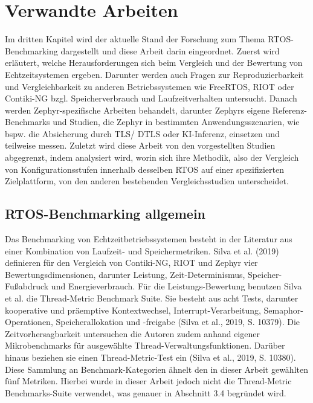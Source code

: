 \chapter{Verwandte Arbeiten}

Im dritten Kapitel wird der aktuelle Stand der Forschung zum Thema RTOS-Benchmarking dargestellt und diese Arbeit darin eingeordnet. Zuerst wird erläutert, welche Herausforderungen sich beim Vergleich und der Bewertung von Echtzeitsystemen ergeben. Darunter werden auch Fragen zur Reproduzierbarkeit und Vergleichbarkeit zu anderen Betriebssystemen wie FreeRTOS, RIOT oder Contiki-NG bzgl. Speicherverbrauch und Laufzeitverhalten untersucht. Danach werden Zephyr-spezifische Arbeiten behandelt, darunter Zephyrs eigene Referenz-Benchmarks und Studien, die Zephyr in bestimmten Anwendungsszenarien, wie bspw. die Absicherung durch TLS/ DTLS oder KI-Inferenz, einsetzen und teilweise messen. Zuletzt wird diese Arbeit von den vorgestellten Studien abgegrenzt, indem analysiert wird, worin sich ihre Methodik, also der Vergleich von Konfigurationsstufen innerhalb desselben RTOS auf einer spezifizierten Zielplattform, von den anderen bestehenden Vergleichsstudien unterscheidet.

\section{RTOS-Benchmarking allgemein}
Das Benchmarking von Echtzeitbetriebssystemen besteht in der Literatur aus einer Kombination von Laufzeit- und Speichermetriken. Silva et al. (2019) definieren für den Vergleich von Contiki-NG, RIOT und Zephyr vier Bewertungsdimensionen, darunter Leistung, Zeit-Determinismus, Speicher-Fußabdruck und Energieverbrauch. Für die Leistungs-Bewertung benutzen Silva et al. die Thread-Metric Benchmark Suite. Sie besteht aus acht Tests, darunter kooperative und präemptive Kontextwechsel, Interrupt-Verarbeitung, Semaphor-Operationen, Speicherallokation und -freigabe (Silva et al., 2019, S. 10379). Die Zeitvorhersagbarkeit untersuchen die Autoren zudem anhand eigener Mikrobenchmarks für ausgewählte Thread-Verwaltungsfunktionen. Darüber hinaus beziehen sie einen Thread-Metric-Test ein (Silva et al., 2019, S. 10380). Diese Sammlung an Benchmark-Kategorien ähnelt den in dieser Arbeit gewählten fünf Metriken. Hierbei wurde in dieser Arbeit jedoch nicht die Thread-Metric Benchmarks-Suite verwendet, was genauer in Abschnitt 3.4 begründet wird.

